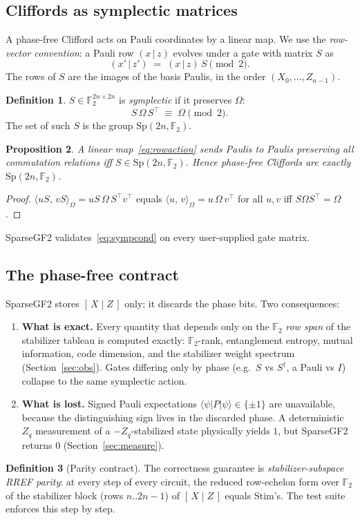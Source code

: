 \documentclass[11pt]{article}
\theoremstyle{definition}
\newtheorem{definition}{Definition}[section]
\theoremstyle{plain}
\newtheorem{proposition}[definition]{Proposition}
\newcommand{\F}{\mathbb{F}}
\newcommand{\Sp}{\mathrm{Sp}}
\newcommand{\sympprod}[2]{\langle #1,\, #2\rangle_{\Omega}}
\newcommand{\xz}{(x\,|\,z)}
\newcommand{\code}{\textsf{\small SparseGF2}}
\newcommand{\ket}[1]{\lvert #1\rangle}
\newcommand{\bra}[1]{\langle #1\rvert}
\begin{document}
\subsection{Cliffords as symplectic matrices}
A phase-free Clifford acts on Pauli coordinates by a linear map. We use the
\emph{row-vector convention}: a Pauli row $\xz$ evolves under a gate with
matrix $S$ as
\begin{equation}
\label{eq:rowaction}
  (x'\,|\,z') \;=\; (x\,|\,z)\,S \pmod 2 .
\end{equation}
The rows of $S$ are the images of the basis Paulis, in the order
$(X_0,\dots,Z_{n-1})$.
\begin{definition}
$S\in\F_2^{2n\times 2n}$ is \emph{symplectic} if it preserves $\Omega$:
\begin{equation}
\label{eq:sympcond}
  S\,\Omega\,S^{\!\top} \;\equiv\; \Omega \pmod 2 .
\end{equation}
The set of such $S$ is the group $\Sp(2n,\F_2)$.
\end{definition}
\begin{proposition}
A linear map~\eqref{eq:rowaction} sends Paulis to Paulis preserving all
commutation relations iff $S\in\Sp(2n,\F_2)$. Hence phase-free Cliffords are
exactly $\Sp(2n,\F_2)$.
\end{proposition}
\begin{proof}
$\sympprod{uS}{vS}=uS\,\Omega\,S^{\!\top}v^{\!\top}$ equals
$\sympprod{u}{v}=u\,\Omega\,v^{\!\top}$ for all $u,v$ iff
$S\Omega S^{\!\top}=\Omega$.
\end{proof}
\code{} validates~\eqref{eq:sympcond} on every user-supplied gate matrix.

\subsection{The phase-free contract}
\label{sec:phasefree}
\code{} stores $[\,X\mid Z\,]$ only; it discards the phase bits. Two consequences:
\begin{enumerate}[leftmargin=2em]
\item \textbf{What is exact.} Every quantity that depends only on the
  $\F_2$ \emph{row span} of the stabilizer tableau is computed exactly:
  $\F_2$-rank, entanglement entropy, mutual information, code dimension, and
  the stabilizer weight spectrum (Section~\ref{sec:obs}). Gates differing only
  by phase (e.g.\ $S$ vs $S^\dagger$, a Pauli vs $I$) collapse to the same
  symplectic action.
\item \textbf{What is lost.} Signed Pauli expectations
  $\bra{\psi}P\ket{\psi}\in\{\pm1\}$ are unavailable, because the distinguishing
  sign lives in the discarded phase. A deterministic $Z_q$ measurement of a
  $-Z_q$-stabilized state physically yields $1$, but \code{} returns $0$
  (Section~\ref{sec:measure}).
\end{enumerate}
\begin{definition}[Parity contract]
The correctness guarantee is \emph{stabilizer-subspace RREF parity}: at every
step of every circuit, the reduced row-echelon form over $\F_2$ of the
stabilizer block (rows $n..2n{-}1$) of $[\,X\mid Z\,]$ equals Stim's. The test
suite enforces this step by step.
\end{definition}
\end{document}
